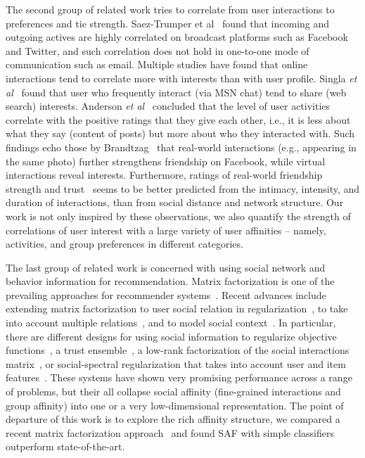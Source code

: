 The second group of related work tries to correlate from user interactions to preferences and tie strength. 
Saez-Trumper et al~\cite{saez2011high} found that incoming and outgoing actives are
highly correlated on broadcast platforms such as Facebook and Twitter,
and such correlation does not hold in one-to-one mode of communication
such as email. Multiple studies have found that online interactions
tend to correlate more with interests than with user profile. Singla {\it et al}~\cite{singla2008yes} found that user who frequently interact (via MSN chat) tend to share (web search) interests. 
Anderson {\it et al}~\cite{Anderson2012} concluded that the level of user activities correlate with the positive ratings that they give each other, i.e., it is less about what they say (content of posts) but more about who they interacted with. Such findings echo those by Brandtzag~\cite{brandtzag2011facebook}
that real-world interactions (e.g., appearing in the same photo) further strengthens friendship on Facebook, while virtual interactions reveal interests. Furthermore, ratings of real-world friendship strength and trust~\cite{gilbert2009predicting} seems to be better predicted from the intimacy, intensity, and duration of interactions, than from social distance and network structure. 
Our work is not only inspired by these observations, we also quantify the strength of correlations 
of user interest with a large variety of user affinities -- namely, activities, and group preferences in different categories.

The last group of related work is concerned with using social network and behavior information for recommendation. 
Matrix factorization is one of the prevailing approaches for recommender systems~\cite{koren2009matrix,sorec}. Recent advances include extending matrix factorization to user social relation in regularization~\cite{sr,rrmf}, to take into account multiple relations~\cite{tf,Jiang2012SRA},  and to model social context~\cite{Jiang2012SCR}. 
In particular, there are different designs for using social information to regularize objective functions~\cite{lla}, a trust
ensemble~\cite{ste}, a low-rank factorization of the social
interactions matrix~\cite{sorec}, or social-spectral regularization that takes into account user and item features~\cite{Noel2012NOF}.  These systems have shown very promising performance across a range of problems, but their all collapse social affinity (fine-grained interactions and group affinity) into one or a very low-dimensional representation. The point of departure of this work is to explore the rich affinity structure, we compared a recent matrix factorization approach~\cite{Noel2012NOF} and found SAF with simple classifiers outperform state-of-the-art.

